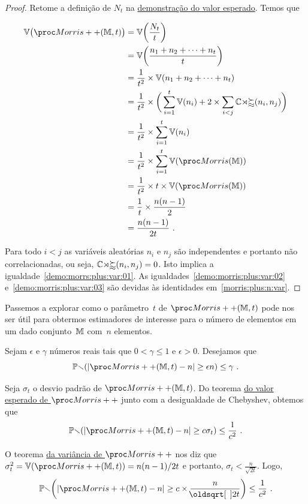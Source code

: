\begin{proof}
  Retome a definição de $N_t$ na \hyperref[demo:morris:plus]{demonstração do valor esperado}. Temos que

  \begin{align}
    \Vbb\big(\Morrispp(\Mbb,t)\big) & = \Vbb\bigg(\frac{N_t}{t}\bigg) \nonumber\\
    & = \Vbb\bigg(\frac{n_1 + n_2 + \dots +n_t}{t} \bigg) \nonumber\\
    &= \frac{1}{t^2} \times \Vbb(n_1 + n_2 + \dots + n_t)  \nonumber\\
    &= \frac{1}{t^2} \times \bigg(\sum_{i=1}^t\Vbb(n_i) + 2\times \sum_{i<j}\Cov(n_i,n_j)\bigg)\\
    &= \frac{1}{t^2} \times \sum_{i=1}^t\Vbb(n_i) \label{demo:morrs:plus:var:01}\\
    &= \frac{1}{t^2} \times \sum_{i=1}^t\Vbb(\Morris(\Mbb)) \label{demo:morris:plus:var:02} \\
    &= \frac{1}{t^2} \times t \times \Vbb(\Morris(\Mbb)) \nonumber\\
    &= \frac{1}{t} \times \frac{n(n-1)}{2} \label{demo:morris:plus:var:03}\\
    &= \frac{n(n-1)}{2t}\ . \nonumber
  \end{align}
  
  Para todo $i < j$ as variáveis aleatórias $n_i$ e $n_j$ são independentes e portanto não correlacionadas,
  ou seja, $\mathbb{Cov}(n_i,n_j) = 0$. Isto implica a igualdade~\eqref{demo:morrs:plus:var:01}.
  As igualdades~\eqref{demo:morris:plus:var:02} e~\eqref{demo:morris:plus:var:03} são devidas às identidades 
  em~\eqref{morris:plus:n:var}.
\end{proof}

Passemos a explorar como o parâmetro~$t$ de $\Morrispp(\Mbb,t)$ pode nos ser útil para obtermos estimadores de interesse
para o número de elementos em um dado conjunto~$\mathbb{M}$ com~$n$ elementos.

Sejam $\epsilon$ e $\gamma$ números reais tais que $0 < \gamma \leq 1$ e $\epsilon > 0$. Desejamos que
\[ \Pbb(|\Morrispp(\Mbb,t)-n| \geq \epsilon n) \leq \gamma \ . \]

Seja $\sigma_t$ o desvio padrão de $\Morrispp(\Mbb,t)$. Do teorema 
\hyperref[morris:plus:expected_value]{do valor esperado de $\Morrispp$} junto com a desigualdade de Chebyshev, obtemos 
que
\[ \Pbb(|\Morrispp(\Mbb,t)-n| \geq c\sigma_t) \leq \frac{1}{c^2} \ . \]

O teorema \hyperref[morris:plus:variance]{da variância de $\Morrispp$} nos diz que 
$\sigma^2_t = \Vbb(\Morrispp(\Mbb, t)) = n(n-1)/2t$ e portanto, $\sigma_t < \frac{n}{\sqrt{2t}}$. Logo, 
\begin{align}
  \Pbb\bigg(|\Morrispp(\Mbb,t)-n| \geq c \times \frac{n}{\sqrt{2t}}\bigg) \leq \frac{1}{c^2} \ . 
  \label{morris:plus:prob:01}
\end{align}

